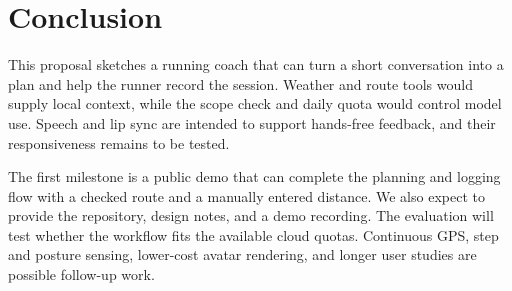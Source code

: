 \section{Conclusion}\label{sec:conclusion}
This proposal sketches a running coach that can turn a short conversation into a plan and help the runner record the session. Weather and route tools would supply local context, while the scope check and daily quota would control model use. Speech and lip sync are intended to support hands-free feedback, and their responsiveness remains to be tested.

The first milestone is a public demo that can complete the planning and logging flow with a checked route and a manually entered distance. We also expect to provide the repository, design notes, and a demo recording. The evaluation will test whether the workflow fits the available cloud quotas. Continuous GPS, step and posture sensing, lower-cost avatar rendering, and longer user studies are possible follow-up work.
